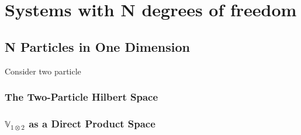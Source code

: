 \chapter{Systems with N degrees of freedom}
\section{N Particles in One Dimension}
Consider two particle 
\subsection{The Two-Particle Hilbert Space}
\subsection{$\mathbb{V}_{1 \otimes 2}$ as a Direct Product Space}
